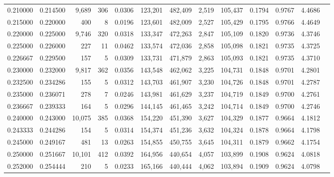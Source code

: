 \begin{tabular}{rrrrrrrrrrrrr}
0.210000 & 0.214500 &  9,689 &   306 &                                     0.0306 & 123,201 & 482,409 &   2,519 & 105,437 & 0.1794 & 0.9767 & 4.4686 \\
0.215000 & 0.220000 &    400 &     8 &                                     0.0196 & 123,601 & 482,009 &   2,527 & 105,429 & 0.1795 & 0.9766 & 4.4649 \\
0.220000 & 0.225000 &  9,746 &   320 &                                     0.0318 & 133,347 & 472,263 &   2,847 & 105,109 & 0.1820 & 0.9736 & 4.3746 \\
0.225000 & 0.226000 &    227 &    11 &                                     0.0462 & 133,574 & 472,036 &   2,858 & 105,098 & 0.1821 & 0.9735 & 4.3725 \\
0.226667 & 0.229500 &    157 &     5 &                                     0.0309 & 133,731 & 471,879 &   2,863 & 105,093 & 0.1821 & 0.9735 & 4.3710 \\
0.230000 & 0.232000 &  9,817 &   362 &                                     0.0356 & 143,548 & 462,062 &   3,225 & 104,731 & 0.1848 & 0.9701 & 4.2801 \\
0.232500 & 0.234286 &    155 &     5 &                                     0.0312 & 143,703 & 461,907 &   3,230 & 104,726 & 0.1848 & 0.9701 & 4.2787 \\
0.235000 & 0.236071 &    278 &     7 &                                     0.0246 & 143,981 & 461,629 &   3,237 & 104,719 & 0.1849 & 0.9700 & 4.2761 \\
0.236667 & 0.239333 &    164 &     5 &                                     0.0296 & 144,145 & 461,465 &   3,242 & 104,714 & 0.1849 & 0.9700 & 4.2746 \\
0.240000 & 0.243000 & 10,075 &   385 &                                     0.0368 & 154,220 & 451,390 &   3,627 & 104,329 & 0.1877 & 0.9664 & 4.1812 \\
0.243333 & 0.244286 &    154 &     5 &                                     0.0314 & 154,374 & 451,236 &   3,632 & 104,324 & 0.1878 & 0.9664 & 4.1798 \\
0.245000 & 0.249167 &    481 &    13 &                                     0.0263 & 154,855 & 450,755 &   3,645 & 104,311 & 0.1879 & 0.9662 & 4.1754 \\
0.250000 & 0.251667 & 10,101 &   412 &                                     0.0392 & 164,956 & 440,654 &   4,057 & 103,899 & 0.1908 & 0.9624 & 4.0818 \\
0.252000 & 0.254444 &    210 &     5 &                                     0.0233 & 165,166 & 440,444 &   4,062 & 103,894 & 0.1909 & 0.9624 & 4.0798 \\

\end{tabular}

